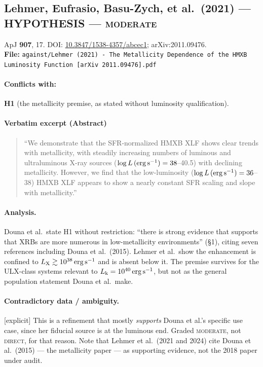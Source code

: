 \documentclass[11pt,a4paper]{article}
\newcommand{\HYP}{\textcolor{blue!60!black}{\textbf{HYPOTHESIS}}}
\newcommand{\flag}[1]{\textcolor{orange!75!black}{\textsf{\small [#1]}}}
\begin{document}
\subsection{Lehmer, Eufrasio, Basu-Zych, et al.\ (2021) --- \HYP{} --- \textsc{moderate}}
\noindent ApJ \textbf{907}, 17. DOI:
\href{https://doi.org/10.3847/1538-4357/abcec1}{10.3847/1538-4357/abcec1};
arXiv:2011.09476.\\
\textbf{File:} \texttt{against/Lehmer (2021) - The Metallicity Dependence of the HMXB Luminosity Function [arXiv 2011.09476].pdf}

\paragraph{Conflicts with:} \textbf{H1} (the metallicity premise, as stated
without luminosity qualification).

\paragraph{Verbatim excerpt (Abstract)}
\begin{quote}\small
``We demonstrate that the SFR-normalized HMXB XLF shows clear trends with
metallicity, with steadily increasing numbers of luminous and ultraluminous
X-ray sources ($\log L\,({\rm erg\,s^{-1}}) = 38$--40.5) with declining
metallicity. However, we find that the low-luminosity
($\log L\,({\rm erg\,s^{-1}}) = 36$--38) HMXB XLF appears to show a nearly
constant SFR scaling and slope with metallicity.''
\end{quote}

\paragraph{Analysis.}
Douna et al.\ state H1 without restriction: ``there is strong evidence that
supports that XRBs are more numerous in low-metallicity environments'' (\S1),
citing seven references including Douna et al.\ (2015). Lehmer et al.\ show the
enhancement is confined to $L_{\rm X}\gtrsim10^{38}\,{\rm erg\,s^{-1}}$ and is
absent below it. The premise survives for the ULX-class systems relevant to
$L_{\rm k}=10^{40}\,{\rm erg\,s^{-1}}$, but not as the general population
statement Douna et al.\ make.

\paragraph{Contradictory data / ambiguity.} \flag{explicit}
This is a refinement that mostly \emph{supports} Douna et al.'s specific use
case, since her fiducial source is at the luminous end. Graded
\textsc{moderate}, not \textsc{direct}, for that reason. Note that Lehmer et
al.\ (2021 and 2024) cite Douna et al.\ (2015) --- the metallicity paper --- as
supporting evidence, not the 2018 paper under audit.
\end{document}
